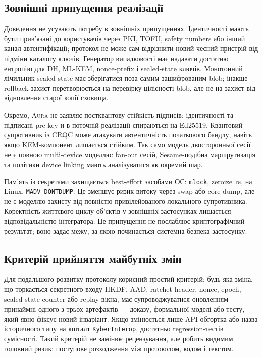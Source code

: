 \documentclass[11pt,a4paper]{article}
\theoremstyle{definition}
\newcommand{\HKDF}{\textsf{HKDF}}
\newcommand{\Aura}{\mbox{\normalfont\scshape Aura}}
\begin{document}
\subsection{Зовнішні припущення реалізації}

Доведення не усувають потребу в зовнішніх припущеннях. Ідентичності
мають бути прив'язані до користувачів через PKI, TOFU, safety numbers
або інший канал автентифікації; протокол не може сам відрізнити новий
чесний пристрій від підміни каталогу ключів. Генератор випадковості
має надавати достатню ентропію для DH, ML-KEM, nonce-prefix і
sealed-state ключів. Монотонний лічильник sealed state має зберігатися
поза самим зашифрованим blob; інакше rollback-захист перетворюється на
перевірку цілісності blob, але не на захист від відновлення старої
копії сховища.

Окремо, \Aura{} не заявляє постквантову стійкість підписів: ідентичності
та підписані pre-key-и в поточній реалізації спираються на Ed25519.
Квантовий супротивник із CRQC може атакувати автентичність початкового
бандлу, навіть якщо KEM-компонент лишається стійким. Так само модель
двосторонньої сесії не є повною multi-device моделлю: fan-out сесій,
Sesame-подібна маршрутизація та політики device linking мають
аналізуватися як окремий шар.

Пам'ять із секретами захищається best-effort засобами ОС:
\texttt{mlock}, zeroize та, на Linux, \texttt{MADV\_DONTDUMP}. Це
зменшує ризик витоку через swap або core dump, але не є моделлю
захисту від повністю привілейованого локального супротивника.
Коректність життєвого циклу об'єктів у зовнішніх застосунках лишається
відповідальністю інтегратора. Це припущення не послаблює
криптографічний результат; воно задає межу, за якою починається
системна безпека застосунку.

\subsection{Критерій прийняття майбутніх змін}

Для подальшого розвитку протоколу корисний простий критерій: будь-яка
зміна, що торкається секретного входу \HKDF{}, AAD, ratchet header,
nonce, epoch, sealed-state counter або replay-вікна, має супроводжуватися
оновленням принаймні одного з трьох артефактів — доказу, формальної
моделі або тесту, який явно фіксує новий інваріант. Якщо змінюється
лише API-обгортка або назва історичного типу на кшталт
\texttt{KyberInterop}, достатньо regression-тестів сумісності. Такий
критерій не замінює рецензування, але робить видимим головний ризик:
поступове розходження між протоколом, кодом і текстом.
\end{document}
